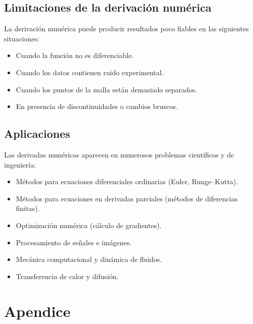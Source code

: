 \documentclass[12pt,a4paper]{article}
\theoremstyle{definition}
\theoremstyle{remark}
\begin{document}
\subsection{Limitaciones de la derivación numérica}

La derivación numérica puede producir resultados poco fiables en
las siguientes situaciones:

\begin{itemize}

\item Cuando la función no es diferenciable.

\item Cuando los datos contienen ruido experimental.

\item Cuando los puntos de la malla están demasiado separados.

\item En presencia de discontinuidades o cambios bruscos.

\end{itemize}

\subsection{Aplicaciones}

Las derivadas numéricas aparecen en numerosos problemas científicos y de ingeniería:

\begin{itemize}

\item Métodos para ecuaciones diferenciales ordinarias (Euler, Runge--Kutta).

\item Métodos para ecuaciones en derivadas parciales (métodos de diferencias finitas).

\item Optimización numérica (cálculo de gradientes).

\item Procesamiento de señales e imágenes.

\item Mecánica computacional y dinámica de fluidos.

\item Transferencia de calor y difusión.

\end{itemize}



\section{Apendice}
\end{document}
